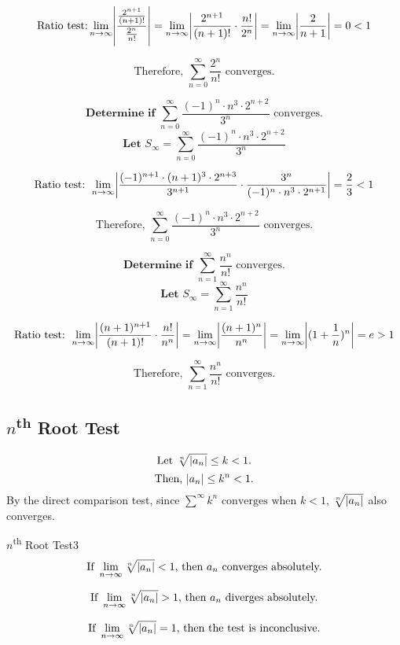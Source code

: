\documentclass{article}
\theoremstyle{definition}
\DeclarePairedDelimiter{\abs}{\lvert}{\rvert}
\begin{document}
\[\text{Ratio test:}
  \lim_{n \to \infty} \abs*{\frac{\frac{2^{n+1}}{(n+1)!}}{\frac{2^n}{n!}}}
= \lim_{n \to \infty} \abs*{\frac{2^{n+1}}{(n+1)!}  \cdot {\frac{n!}{2^n}}}
= \lim_{n \to \infty} \abs*{\frac{2}{n+1}} = 0 < 1 \]

\[\text{Therefore, }\sum_{n=0}^{\infty} \frac{2^n}{n!} \text{ converges.}\]

\vspace{0.5cm}

\[ \textbf{Determine if } \sum_{n=0}^{\infty} \frac{(-1)^n \cdot n^3 \cdot 2^{n+2}}{3^n} \text{ converges.} \]
\[ \textbf{Let } S_\infty=\sum_{n=0}^{\infty} \frac{(-1)^n \cdot n^3 \cdot 2^{n+2}}{3^n}\]


\[\text{Ratio test: } \lim_{n \to \infty} \abs*{\frac{(-1)^{n+1} \cdot (n+1)^3 \cdot 2^{n+3}}{3^{n+1}} \cdot \frac{3^n}{(-1)^n \cdot n^3 \cdot 2^{n+1}}} = \frac{2}{3} < 1\]

\[\text{Therefore, }\sum_{n=0}^{\infty} \frac{(-1)^n \cdot n^3 \cdot 2^{n+2}}{3^n} \text{ converges.}\]


\vspace{0.5cm}

\[ \textbf{Determine if } \sum_{n=1}^{\infty} \frac{n^n}{n!} \text{ converges.} \]
\[ \textbf{Let } S_\infty=\sum_{n=1}^{\infty} \frac{n^n}{n!}\]

\[\text{Ratio test: }\lim_{n \to \infty} \abs*{  \frac{(n+1)^{n+1}}{(n+1)!} \cdot \frac{n!}{n^n}}
= \lim_{n \to \infty} \abs*{ \frac{(n+1)^n}{n^n}} = \lim_{n \to \infty} \abs*{(1+\frac{1}{n})^n} = e > 1\]

\[\text{Therefore, }\sum_{n=1}^{\infty} \frac{n^n}{n!} \text{ converges.}\]




\subsection{$n$\textsuperscript{th} Root Test}

\[\text{Let } \sqrt[n]{\abs{a_n}} \le k < 1.\]
\[\text{Then, } \abs{a_n} \le k^n < 1.\]
By the direct comparison test,  since $\sum^{\infty}k^n \text{ converges when } k<1$, $\sqrt[n]{\abs{a_n}}$ also converges.

\begin{theorem}{$n$\textsuperscript{th} Root Test}{3}
\[\text{If } \lim_{n \to \infty} \sqrt[n]{\abs*{a_n}} < 1 \text{, then } a_n \text{ converges absolutely.} \]

\[\text{If } \lim_{n \to \infty} \sqrt[n]{\abs*{a_n}} > 1 \text{, then } a_n \text{ diverges absolutely.} \]

\[\text{If } \lim_{n \to \infty} \sqrt[n]{\abs*{a_n}} = 1 \text{, then the test is inconclusive.}\]
\end{theorem}
\end{document}
